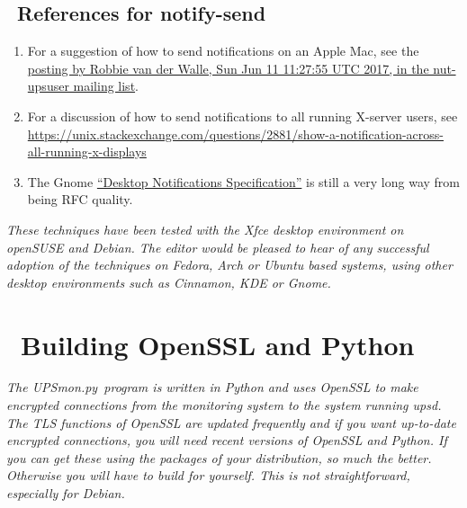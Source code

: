 \documentclass[12pt]{article}
\newlength{\headersep}\setlength{\headersep}{3mm}
\newcommand{\Hsep}{\hspace{\headersep}}
\newcommand{\newcolumn}{\vfill\eject}
\newcommand{\upsd}{\mbox{\textcolor{UPSDCOLOUR}{upsd}}}
\newcommand{\notifysend}{\mbox{\textcolor{NOTIFYCOLOUR}{notify-send}}}
\newcommand{\UPSmon}{\mbox{\textcolor{UPSMONCOLOUR}{UPSmon.py}}}
\newcommand{\ol}{\begin{enumerate}%
   \setlength{\itemsep}{0em}}
\newcommand{\eol}{\end{enumerate}}
\newcommand{\li}{\item}                 %
\begin{document}
\subsection{\Hsep\ References for \notifysend}\label{section:notifysend.references}

\ol

\li For a suggestion of how to send notifications on an Apple Mac, see the
  \href{https://lists.alioth.debian.org/pipermail/nut-upsuser/2017-June/010729.html}{
    posting by Robbie van der Walle, Sun Jun 11 11:27:55 UTC 2017, in the
    nut-upsuser mailing list}.

\li For a discussion of how to send notifications to all running X-server users, see
\href{https://unix.stackexchange.com/questions/2881/show-a-notification-across-all-running-x-displays}%
{https://{\allowbreak}unix.stackexchange.com/{\allowbreak}questions/{\allowbreak}2881/{\allowbreak}show-a-notification-{\allowbreak}across-all-running-{\allowbreak}x-displays}

\li The Gnome \href{https://developer.gnome.org/notification-spec/}{``Desktop
  Notifications Specification''} is still a very long way from being RFC quality.

\eol

\quad

\textsl{These techniques have been tested with the Xfce desktop environment on
  openSUSE and Debian. The editor would be pleased to hear of any successful
  adoption of the techniques on Fedora, Arch or Ubuntu based systems, using
  other desktop environments such as Cinnamon, KDE or Gnome.}

\vspace*{\fill}

\begin{center}
\end{center}

\vspace*{\fill}


\newcolumn
\section{\Hsep\ Building OpenSSL and Python}\label{section:buildOpenSSLPython}

\textsl{The \UPSmon\ program is written in Python and uses OpenSSL to make
  encrypted connections from the monitoring system to the system running
  \upsd.  The TLS functions of OpenSSL are updated frequently and if you want
  up-to-date encrypted connections, you will need recent versions of OpenSSL
  and Python.  If you can get these using the packages of your distribution,
  so much the better.  Otherwise you will have to build for yourself.  This is
  not straightforward, especially for Debian.}
\end{document}
